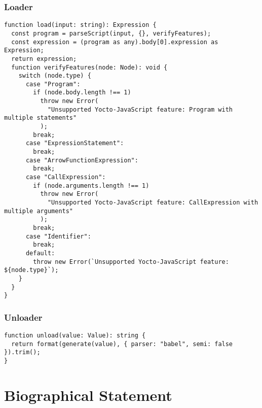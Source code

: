 \documentclass[12pt, oneside]{book}
\begin{document}
\subsection{Loader}
\label{Step 0: Loader}


\begin{verbatim}
function load(input: string): Expression {
  const program = parseScript(input, {}, verifyFeatures);
  const expression = (program as any).body[0].expression as Expression;
  return expression;
  function verifyFeatures(node: Node): void {
    switch (node.type) {
      case "Program":
        if (node.body.length !== 1)
          throw new Error(
            "Unsupported Yocto-JavaScript feature: Program with multiple statements"
          );
        break;
      case "ExpressionStatement":
        break;
      case "ArrowFunctionExpression":
        break;
      case "CallExpression":
        if (node.arguments.length !== 1)
          throw new Error(
            "Unsupported Yocto-JavaScript feature: CallExpression with multiple arguments"
          );
        break;
      case "Identifier":
        break;
      default:
        throw new Error(`Unsupported Yocto-JavaScript feature: ${node.type}`);
    }
  }
}
\end{verbatim}

\subsection{Unloader}
\label{Step 0: Unloader}


\begin{verbatim}
function unload(value: Value): string {
  return format(generate(value), { parser: "babel", semi: false }).trim();
}
\end{verbatim}

\appendix

\backmatter




\chapter{Biographical Statement}

\end{document}
